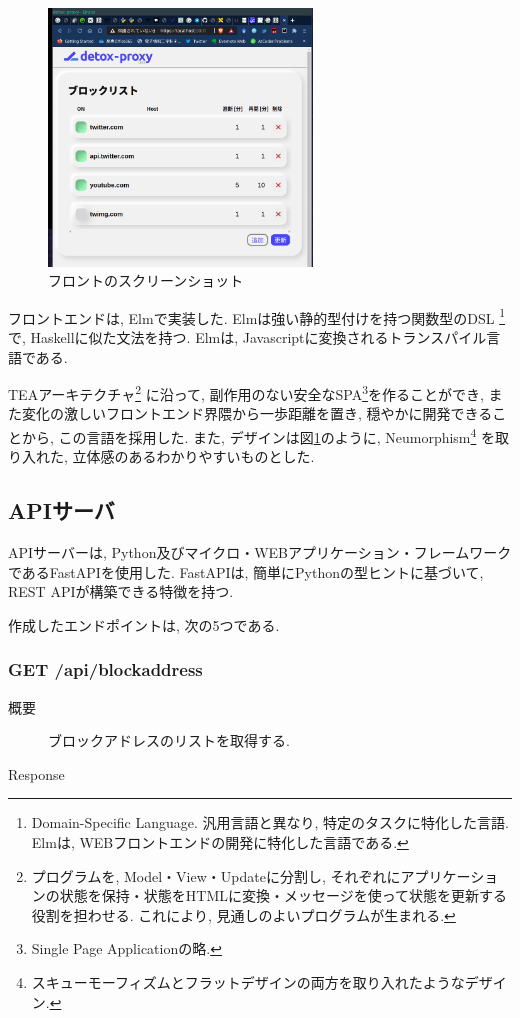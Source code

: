 \documentclass[10pt,a4paper,uplatex,a4j,dvipdfmx]{jsarticle}
\begin{document}
\begin{multicols}{2}
    \begin{figure}[H]
      \center
      \includegraphics[width=7cm]{img/front.png}
      \caption{フロントのスクリーンショット \label{img:front}}
    \end{figure}

    フロントエンドは, Elm\cite{elm}で実装した.
    Elmは強い静的型付けを持つ関数型のDSL
    \footnote{Domain-Specific Language. 汎用言語と異なり, 特定のタスクに特化した言語. Elmは, WEBフロントエンドの開発に特化した言語である.}
    で, Haskell\cite{haskell}に似た文法を持つ. Elmは, Javascriptに変換されるトランスパイル言語である.

    TEAアーキテクチャ\footnote{プログラムを, Model・View・Updateに分割し, それぞれにアプリケーションの状態を保持・状態をHTMLに変換・メッセージを使って状態を更新する役割を担わせる. これにより, 見通しのよいプログラムが生まれる.\cite{elm:tea}}
    に沿って, 副作用のない安全なSPA\footnote{Single Page Applicationの略.}を作ることができ, また変化の激しいフロントエンド界隈から一歩距離を置き, 穏やかに開発できることから, この言語を採用した.
    また, デザインは図\ref{img:front}のように, Neumorphism\footnote{スキューモーフィズムとフラットデザインの両方を取り入れたようなデザイン.}
    を取り入れた, 立体感のあるわかりやすいものとした.
    
    

    \subsection{APIサーバ}
    
    APIサーバーは, Python及びマイクロ・WEBアプリケーション・フレームワークであるFastAPI\cite{fastapi}を使用した. FastAPIは, 簡単にPythonの型ヒントに基づいて, REST APIが構築できる特徴を持つ.
    
    作成したエンドポイントは, 次の5つである.
    
       \subsubsection*{GET /api/blockaddress}
          \begin{description}
            \item[概要] ブロックアドレスのリストを取得する.
            \item[Response] 
          \end{description}


\end{multicols}
\end{document}
